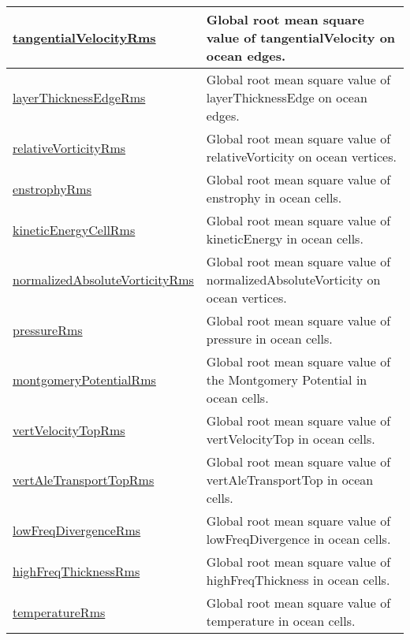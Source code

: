 {\begin{center}
\begin{longtable}{| p{2.0in} | p{4.0in} |}
	\hline
	\hyperref[subsec:var_sec_amGlobalStats_tangentialVelocityRms]{tangentialVelocityRms} & Global root mean square value of tangentialVelocity on ocean edges. \\
	\hline
	\hyperref[subsec:var_sec_amGlobalStats_layerThicknessEdgeRms]{layerThicknessEdgeRms} & Global root mean square value of layerThicknessEdge on ocean edges. \\
	\hline
	\hyperref[subsec:var_sec_amGlobalStats_relativeVorticityRms]{relativeVorticityRms} & Global root mean square value of relativeVorticity on ocean vertices. \\
	\hline
	\hyperref[subsec:var_sec_amGlobalStats_enstrophyRms]{enstrophyRms} & Global root mean square value of enstrophy in ocean cells. \\
	\hline
	\hyperref[subsec:var_sec_amGlobalStats_kineticEnergyCellRms]{kineticEnergyCellRms} & Global root mean square value of kineticEnergy in ocean cells. \\
	\hline
	\hyperref[subsec:var_sec_amGlobalStats_normalizedAbsoluteVorticityRms]{normalizedAbsoluteVorticityRms} & Global root mean square value of normalizedAbsoluteVorticity on ocean vertices. \\
	\hline
	\hyperref[subsec:var_sec_amGlobalStats_pressureRms]{pressureRms} & Global root mean square value of pressure in ocean cells. \\
	\hline
	\hyperref[subsec:var_sec_amGlobalStats_montgomeryPotentialRms]{montgomeryPotentialRms} & Global root mean square value of the Montgomery Potential in ocean cells. \\
	\hline
	\hyperref[subsec:var_sec_amGlobalStats_vertVelocityTopRms]{vertVelocityTopRms} & Global root mean square value of vertVelocityTop in ocean cells. \\
	\hline
	\hyperref[subsec:var_sec_amGlobalStats_vertAleTransportTopRms]{vertAleTransportTopRms} & Global root mean square value of vertAleTransportTop in ocean cells. \\
	\hline
	\hyperref[subsec:var_sec_amGlobalStats_lowFreqDivergenceRms]{lowFreqDivergenceRms} & Global root mean square value of lowFreqDivergence in ocean cells. \\
	\hline
	\hyperref[subsec:var_sec_amGlobalStats_highFreqThicknessRms]{highFreqThicknessRms} & Global root mean square value of highFreqThickness in ocean cells. \\
	\hline
	\hyperref[subsec:var_sec_amGlobalStats_temperatureRms]{temperatureRms} & Global root mean square value of temperature in ocean cells. \\

\end{longtable}
\end{center}}
